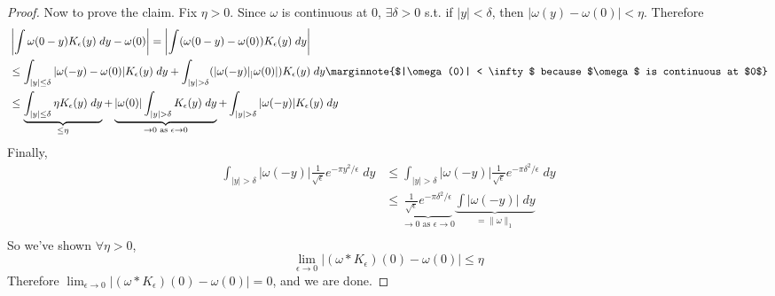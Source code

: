 \begin{proof}
    Now to prove the claim. Fix $ \eta > 0$. Since $\omega$ is continuous at $0$, $\exists \delta > 0$ s.t.
    if $|y| < \delta$, then $|\omega(y) - \omega(0)| < \eta$. Therefore
    \begin{align*}
        &\left| \int \omega(0 - y) K_\epsilon(y) \; dy - \omega(0) \right| = \left| \int (\omega(0 -y) - \omega(0))K_\epsilon(y) \; dy \right|  \\
        &\leq \int_{|y| \leq \delta} |\omega(-y) - \omega(0)| K_\epsilon(y) \; dy  + \int_{|y| > \delta} (|\omega(-y)| _ |\omega(0)|) K_\epsilon(y) \; dy \marginnote{$|\omega(0)| < \infty$ because $\omega$ is continuous at $0$}\\
        &\leq \underbrace{\int_{|y| \leq \delta} \eta K_\epsilon(y) \; dy}_{\leq \eta} + \underbrace{|\omega(0)|\int_{|y| > \delta} K_\epsilon(y) \; dy}_{\to 0 \text{ as } \epsilon \to 0}  + \int_{|y| > \delta} |\omega(-y)| K_\epsilon(y) \; dy \\
    \end{align*}      
    Finally, 
    \begin{align*}
        \int_{|y| > \delta} |\omega(-y)| \frac{1}{\sqrt{\epsilon}}e^{- \pi y^2 / \epsilon} \; dy &\leq \int_{|y| > \delta} |\omega(-y)| \frac{1}{\sqrt{\epsilon}} e^{-\pi \delta^2 / \epsilon} \; dy \\
        &\leq \underbrace{\frac{1}{\sqrt{\epsilon}}e^{- \pi \delta^2 / \epsilon}}_{\to 0 \text{ as } \epsilon \to 0} \underbrace{\int |\omega(-y)| \; dy}_{= \| \omega \|_1 } \\
    \end{align*}
    So we've shown $\forall \eta > 0$,
    \[
        \lim_{\epsilon \to 0} | (\omega * K_\epsilon)(0) - \omega(0)| \leq \eta
    \]  
    Therefore $\lim_{\epsilon \to 0} | (\omega * K_\epsilon)(0) - \omega(0)| = 0$, and we are done. \qedhere
\end{proof}

